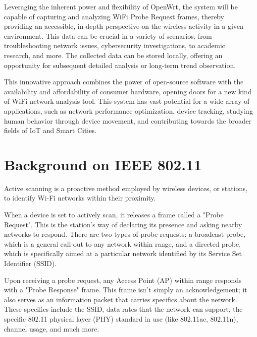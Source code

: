 \documentclass{article}
\begin{document}
Leveraging the inherent power and flexibility of OpenWrt, the system will be capable of capturing and analyzing WiFi Probe Request frames, thereby providing an accessible, in-depth perspective on the wireless activity in a given environment. This data can be crucial in a variety of scenarios, from troubleshooting network issues, cybersecurity investigations, to academic research, and more.
The collected data can be stored locally, offering an opportunity for subsequent detailed analysis or long-term trend observation.

This innovative approach combines the power of open-source software with the availability and affordability of consumer hardware, opening doors for a new kind of WiFi network analysis tool. This system has vast potential for a wide array of applications, such as network performance optimization, device tracking, studying human behavior through device movement, and contributing towards the broader fields of IoT and Smart Cities.



\section{Background on IEEE 802.11}

\begin{info}
    Active scanning is a proactive method employed by wireless devices, or stations, to identify Wi-Fi networks within their proximity.
\end{info}

When a device is set to actively scan, it releases a frame called a "Probe Request". This is the station's way of declaring its presence and asking nearby networks to respond. There are two types of probe requests: a broadcast probe, which is a general call-out to any network within range, and a directed probe, which is specifically aimed at a particular network identified by its Service Set Identifier (SSID).

Upon receiving a probe request, any Access Point (AP) within range responds with a "Probe Response" frame. This frame isn't simply an acknowledgement; it also serves as an information packet that carries specifics about the network. These specifics include the SSID, data rates that the network can support, the specific 802.11 physical layer (PHY) standard in use (like 802.11ac, 802.11n), channel usage, and much more. 
\end{document}
